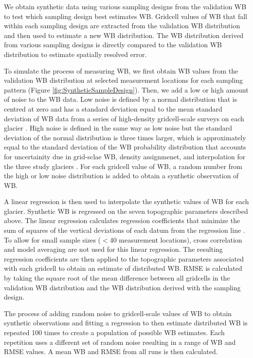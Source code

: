 \documentclass[twocolumn,letterpaper]{igs}
\begin{document}
We obtain synthetic data using various sampling designs from the validation WB to test which sampling design best estimates WB. Gridcell values of WB that fall within each sampling design are extracted from the validation WB distribution and then used to estimate a new WB distribution. The WB distribution derived from various sampling designs is directly compared to the validation WB distribution to estimate spatially resolved error. 

To simulate the process of measuring WB, we first obtain WB values from the validation WB distribution at selected measurement locations for each sampling pattern (Figure \ref{fig:SyntheticSampleDesign}). Then, we add a low or high amount of noise to the WB data. Low noise is defined by a normal distribution that is centred at zero and has a standard deviation equal to the mean standard deviation of WB data from a series of high-density gridcell-scale surveys on each glacier \citep[see][for details]{Pulwicki2017}. High noise is defined in the same way as low noise but the standard deviation of the normal distribution is three times larger, which is approximately equal to the standard deviation of the WB probability distribution that accounts for uncertainity due in grid-sclae WB, density assignmenet, and interpolation for the three study glaciers \citep{Pulwicki2017}. For each gridcell value of WB, a random number from the high or low noise distribution is added to obtain a synthetic observation of WB.

A linear regression is then used to interpolate the synthetic values of WB for each glacier. Synthetic WB is regressed on the seven topographic parameters described above. The linear regression calculates regression coefficients that minimize the sum of squares of the vertical deviations of each datum from the regression line \citep{Davis1986}. To allow for small sample sizes ($<$40 measurement locations), cross correlation and model averaging are not used for this linear regression. The resulting regression coefficients are then applied to the topographic parameters associated with each gridcell to obtain an estimate of distributed WB. RMSE is calculated by taking the square root of the mean difference between all gridcells in the validation WB distribution and the WB distribution derived with the sampling design.

The process of adding random noise to gridcell-scale values of WB to obtain synthetic observations and fitting a regression to then estimate distributed WB is repeated 100 times to create a population of possible WB estimates. Each repetition uses a different set of random noise resulting in a range of WB and RMSE values. A mean WB and RMSE from all runs is then calculated. 
\end{document}
